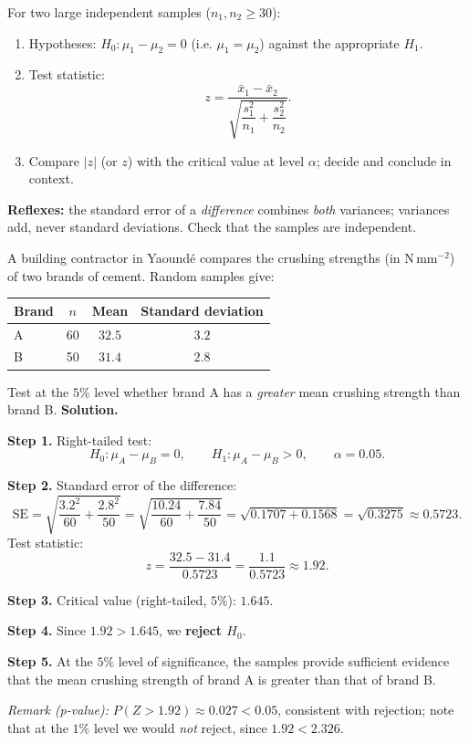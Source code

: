 \documentclass[11pt]{article}
\begin{document}
\begin{methode}
For two large independent samples ($n_1,n_2\geq 30$):
\begin{enumerate}
\item Hypotheses: $H_0:\mu_1-\mu_2=0$ (i.e. $\mu_1=\mu_2$) against the appropriate $H_1$.
\item Test statistic:
\[ z=\frac{\bar{x}_1-\bar{x}_2}{\sqrt{\dfrac{s_1^{2}}{n_1}+\dfrac{s_2^{2}}{n_2}}}. \]
\item Compare $|z|$ (or $z$) with the critical value at level $\alpha$; decide and conclude in context.
\end{enumerate}
\textbf{Reflexes:} the standard error of a \emph{difference} combines \emph{both} variances; variances add, never standard deviations. Check that the samples are independent.
\end{methode}

\begin{exoresolu}
A building contractor in Yaoundé compares the crushing strengths (in $\mathrm{N\,mm^{-2}}$) of two brands of cement. Random samples give:
\begin{center}
\begin{tabular}{|l|c|c|c|}
\hline
\rowcolor{popblueL} Brand & $n$ & Mean & Standard deviation \\
\hline
A & 60 & $32.5$ & $3.2$ \\
\hline
B & 50 & $31.4$ & $2.8$ \\
\hline
\end{tabular}
\end{center}
Test at the $5\%$ level whether brand A has a \emph{greater} mean crushing strength than brand B.
\tcblower
\textbf{Solution.}

\textbf{Step 1.} Right-tailed test:
\[ H_0:\mu_A-\mu_B=0,\qquad H_1:\mu_A-\mu_B>0,\qquad \alpha=0.05. \]

\textbf{Step 2.} Standard error of the difference:
\[ \mathrm{SE}=\sqrt{\frac{3.2^2}{60}+\frac{2.8^2}{50}}=\sqrt{\frac{10.24}{60}+\frac{7.84}{50}}=\sqrt{0.1707+0.1568}=\sqrt{0.3275}\approx 0.5723. \]
Test statistic:
\[ z=\frac{32.5-31.4}{0.5723}=\frac{1.1}{0.5723}\approx 1.92. \]

\textbf{Step 3.} Critical value (right-tailed, $5\%$): $1.645$.

\textbf{Step 4.} Since $1.92>1.645$, we \textbf{reject $H_0$}.

\textbf{Step 5.} At the $5\%$ level of significance, the samples provide sufficient evidence that the mean crushing strength of brand A is greater than that of brand B.

\emph{Remark (p-value):} $P(Z>1.92)\approx 0.027<0.05$, consistent with rejection; note that at the $1\%$ level we would \emph{not} reject, since $1.92<2.326$.
\end{exoresolu}
\end{document}
